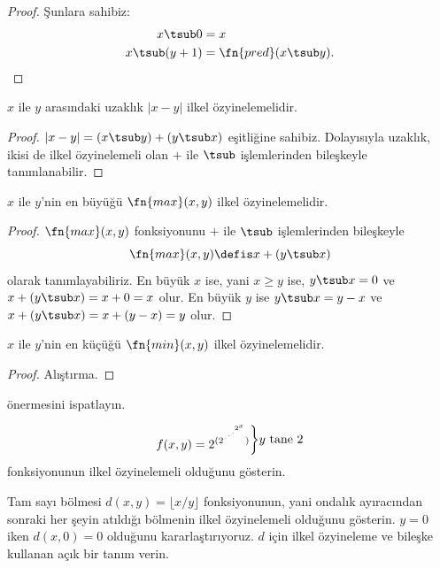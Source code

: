 \documentclass[../../../include/open-logic-section]{subfiles}
\begin{document}
\begin{proof}
  Şunlara sahibiz:
  \begin{align*}
    x\tsub0 & = x\\
    x\tsub(y+1) & = \fn{pred}(x\tsub y).
  \end{align*}
\end{proof}

\begin{prop}
  $x$ ile $y$ arasındaki uzaklık $\lvert x-y\rvert$ ilkel özyinelemelidir.
\end{prop}

\begin{proof}
  $\lvert x-y\rvert=(x\tsub y)+(y\tsub x)$ eşitliğine sahibiz. Dolayısıyla
  uzaklık, ikisi de ilkel özyinelemeli olan $+$ ile $\tsub$ işlemlerinden
  bileşkeyle tanımlanabilir.
\end{proof}

\begin{prop}
  $x$ ile $y$'nin en büyüğü $\fn{max}(x,y)$ ilkel özyinelemelidir.
\end{prop}

\begin{proof}
  $\fn{max}(x,y)$ fonksiyonunu $+$ ile $\tsub$ işlemlerinden bileşkeyle
  \[
    \fn{max}(x,y)\defis x+(y\tsub x)
  \]
  olarak tanımlayabiliriz. En büyük $x$ ise, yani $x\geq y$ ise,
  $y\tsub x=0$ ve $x+(y\tsub x)=x+0=x$ olur. En büyük $y$ ise
  $y\tsub x=y-x$ ve $x+(y\tsub x)=x+(y-x)=y$ olur.
\end{proof}

\begin{prop}
  $x$ ile $y$'nin en küçüğü $\fn{min}(x,y)$ ilkel özyinelemelidir.
\end{prop}

\begin{proof}
  Alıştırma.
\end{proof}

\begin{prob}
   önermesini ispatlayın.
\end{prob}

\begin{prob}
\[
  f(x,y)=2^{(2^{\iddots^{2^x}})}
  \raisebox{1ex}{\bigg\rbrace}
  \raisebox{1ex}{\text{$y$ tane $2$}}
\]
fonksiyonunun ilkel özyinelemeli olduğunu gösterin.
\end{prob}

\begin{prob}
Tam sayı bölmesi $d(x,y)=\lfloor x/y\rfloor$ fonksiyonunun, yani ondalık
ayıracından sonraki her şeyin atıldığı bölmenin ilkel özyinelemeli olduğunu
gösterin. $y=0$ iken $d(x,0)=0$ olduğunu kararlaştırıyoruz. $d$ için ilkel
özyineleme ve bileşke kullanan açık bir tanım verin.
\end{prob}
\end{document}
